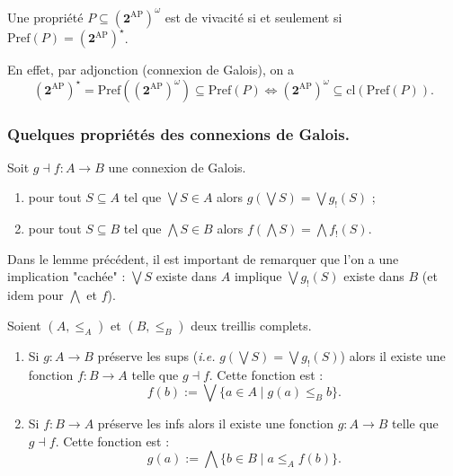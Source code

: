 \documentclass[./main]{subfiles}
\begin{document}
  \begin{prop}
    Une propriété $P \subseteq (\mathbf{2}^\mathrm{AP})^\omega$ est de vivacité si et seulement si $\mathrm{Pref}(P) = (\mathbf{2}^\mathrm{AP})^\star$.
  \end{prop}
  \begin{prv}
    En effet, par adjonction (connexion de Galois),
    on a 
    \[
      (\mathbf{2}^\mathrm{AP})^\star = \mathrm{Pref}((\mathbf{2}^\mathrm{AP})^\omega) \subseteq \mathrm{Pref}(P)
      \iff (\mathbf{2}^\mathrm{AP})^\omega \subseteq \mathrm{cl}(\mathrm{Pref}(P))
    .\]
  \end{prv}

  \subsubsection{Quelques propriétés des connexions de Galois.}

  \begin{lem}
    Soit $g \dashv f : A \to B$ une connexion de Galois.
    \begin{enumerate}
      \item pour tout $S \subseteq A$ tel que $\bigvee S \in A$ alors $g(\bigvee S) = \bigvee g_!(S)$ ;
      \item pour tout $S \subseteq B$ tel que $\bigwedge S \in B$ alors $f(\bigwedge S) = \bigwedge f_!(S)$.
    \end{enumerate}
  \end{lem}

  \begin{rmk}
    Dans le lemme précédent, il est important de remarquer que l'on a une implication "cachée" :
    $\bigvee S$ existe dans $A$ implique $\bigvee g_!(S)$ existe dans  $B$ (et idem pour $\bigwedge$ et $f$).
  \end{rmk}

  \begin{lem}
    Soient $(A, \le_A)$ et $(B, \le_B)$ deux treillis complets.
    \begin{enumerate}
      \item Si $g : A \to B$ préserve les sups (\textit{i.e.} $g(\bigvee S) = \bigvee g_!(S)$) alors il existe une fonction $f : B \to A$ telle que $g \dashv f$.
        Cette fonction est :
        \[
        f(b) := \bigvee \{a \in A  \mid g(a) \le_B b\} 
        .\]
      \item Si $f : B \to A$ préserve les infs alors il existe une fonction $g : A \to B$ telle que $g \dashv f$.
        Cette fonction est :
        \[
        g(a) := \bigwedge \{b \in B  \mid a \le_A f(b)\} 
        .\] 
    \end{enumerate}
  \end{lem}
\end{document}
